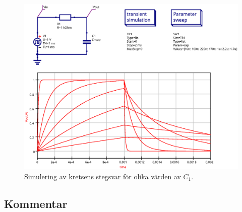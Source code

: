 \begin{figure}[ht]
    \centering
    \includegraphics[width=\linewidth]{sim/ee466_lab-4_prj/uppgift-2_param}
    \caption[] {Simulering av kretsens stegsvar för olika värden av $C_1$.}
    \label{fig:step-sim-param}
\end{figure}


\subsection{Kommentar}\label{}

